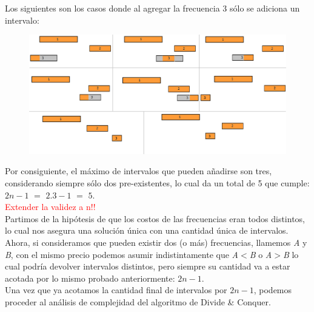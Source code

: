 Los siguientes son los casos donde al agregar la frecuencia $3$ s\'olo se adiciona un intervalo:
  \begin{figure}[h!]
   \begin{center}
 	\includegraphics[scale=0.2]{imagenes/ej2/secuencias/Paso2/todos1.png}
   \end{center}
 \end{figure}

Por consiguiente, el m\'aximo de intervalos que pueden a\~nadirse son tres, considerando siempre s\'olo dos pre-existentes, lo cual da un total de 5 que cumple: $2n-1$ $=$ $2$.$3-1$ $=$ $5$.\\


\textcolor{red}{Extender la validez a n!!}\\


Partimos de la hip\'otesis de que los costos de las frecuencias eran todos distintos, lo cual nos asegura una soluci\'on \'unica con una cantidad \'unica de intervalos. Ahora, si consideramos que pueden existir dos (o m\'as) frecuencias, llamemos \emph{A} y \emph{B}, con el mismo precio podemos asumir indistintamente que \emph{A$<$B} o \emph{A$>$B} lo cual podr\'ia devolver intervalos distintos, pero siempre su cantidad va a estar acotada por lo mismo probado anteriormente: $2n-1$.\\

Una vez que ya acotamos la cantidad final de intervalos por $2n-1$, podemos proceder al an\'alisis de complejidad del algoritmo de Divide \& Conquer.\\


